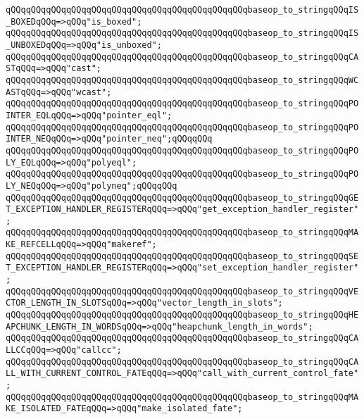 \verb|qQQqqQQqqQQqqQQqqQQqqQQqqQQqqQQqqQQqqQQqqQQqqQQqbaseop_to_stringqQQqIS_BOXEDqQQq=>qQQq"is_boxed";|\newline
\verb|qQQqqQQqqQQqqQQqqQQqqQQqqQQqqQQqqQQqqQQqqQQqqQQqbaseop_to_stringqQQqIS_UNBOXEDqQQq=>qQQq"is_unboxed";|\newline
\verb|qQQqqQQqqQQqqQQqqQQqqQQqqQQqqQQqqQQqqQQqqQQqqQQqbaseop_to_stringqQQqCASTqQQq=>qQQq"cast";|\newline
\verb|qQQqqQQqqQQqqQQqqQQqqQQqqQQqqQQqqQQqqQQqqQQqqQQqbaseop_to_stringqQQqWCASTqQQq=>qQQq"wcast";|\newline
\verb|qQQqqQQqqQQqqQQqqQQqqQQqqQQqqQQqqQQqqQQqqQQqqQQqbaseop_to_stringqQQqPOINTER_EQLqQQq=>qQQq"pointer_eql";|\newline
\verb|qQQqqQQqqQQqqQQqqQQqqQQqqQQqqQQqqQQqqQQqqQQqqQQqbaseop_to_stringqQQqPOINTER_NEQqQQq=>qQQq"pointer_neq";qQQqqQQq|\newline
\verb|qQQqqQQqqQQqqQQqqQQqqQQqqQQqqQQqqQQqqQQqqQQqqQQqbaseop_to_stringqQQqPOLY_EQLqQQq=>qQQq"polyeql";|\newline
\verb|qQQqqQQqqQQqqQQqqQQqqQQqqQQqqQQqqQQqqQQqqQQqqQQqbaseop_to_stringqQQqPOLY_NEQqQQq=>qQQq"polyneq";qQQqqQQq|\newline
\verb|qQQqqQQqqQQqqQQqqQQqqQQqqQQqqQQqqQQqqQQqqQQqqQQqbaseop_to_stringqQQqGET_EXCEPTION_HANDLER_REGISTERqQQq=>qQQq"get_exception_handler_register";|\newline
\verb|qQQqqQQqqQQqqQQqqQQqqQQqqQQqqQQqqQQqqQQqqQQqqQQqbaseop_to_stringqQQqMAKE_REFCELLqQQq=>qQQq"makeref";|\newline
\verb|qQQqqQQqqQQqqQQqqQQqqQQqqQQqqQQqqQQqqQQqqQQqqQQqbaseop_to_stringqQQqSET_EXCEPTION_HANDLER_REGISTERqQQq=>qQQq"set_exception_handler_register";|\newline
\verb|qQQqqQQqqQQqqQQqqQQqqQQqqQQqqQQqqQQqqQQqqQQqqQQqbaseop_to_stringqQQqVECTOR_LENGTH_IN_SLOTSqQQq=>qQQq"vector_length_in_slots";|\newline
\verb|qQQqqQQqqQQqqQQqqQQqqQQqqQQqqQQqqQQqqQQqqQQqqQQqbaseop_to_stringqQQqHEAPCHUNK_LENGTH_IN_WORDSqQQq=>qQQq"heapchunk_length_in_words";|\newline
\verb|qQQqqQQqqQQqqQQqqQQqqQQqqQQqqQQqqQQqqQQqqQQqqQQqbaseop_to_stringqQQqCALLCCqQQq=>qQQq"callcc";|\newline
\verb|qQQqqQQqqQQqqQQqqQQqqQQqqQQqqQQqqQQqqQQqqQQqqQQqbaseop_to_stringqQQqCALL_WITH_CURRENT_CONTROL_FATEqQQq=>qQQq"call_with_current_control_fate";|\newline
\verb|qQQqqQQqqQQqqQQqqQQqqQQqqQQqqQQqqQQqqQQqqQQqqQQqbaseop_to_stringqQQqMAKE_ISOLATED_FATEqQQq=>qQQq"make_isolated_fate";|\newline

